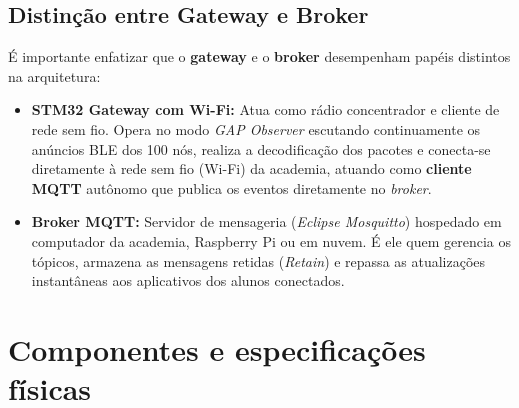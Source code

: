 \documentclass[11pt,a4paper]{article}
\begin{document}
\subsection{Distinção entre Gateway e Broker}
É importante enfatizar que o \textbf{gateway} e o \textbf{broker} desempenham papéis
distintos na arquitetura:
\begin{itemize}
  \item \textbf{STM32 Gateway com Wi-Fi:} Atua como rádio concentrador e cliente de rede sem fio.
        Opera no modo \emph{GAP Observer} escutando continuamente os anúncios BLE dos 100 nós, realiza
        a decodificação dos pacotes e conecta-se diretamente à rede sem fio (Wi-Fi) da academia,
        atuando como \textbf{cliente MQTT} autônomo que publica os eventos diretamente no \emph{broker}.
  \item \textbf{Broker MQTT:} Servidor de mensageria (\emph{Eclipse Mosquitto}) hospedado em
        computador da academia, Raspberry Pi ou em nuvem. É ele quem gerencia os tópicos,
        armazena as mensagens retidas (\emph{Retain}) e repassa as atualizações instantâneas
        aos aplicativos dos alunos conectados.
\end{itemize}

\section{Componentes e especificações físicas}
\end{document}
